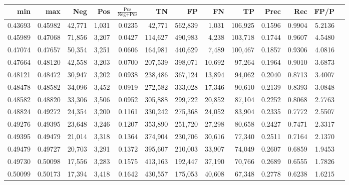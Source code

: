 \begin{tabular}{rrrrrrrrrrrrr}
\toprule
    min &     max &    Neg &   Pos & $\frac{\text{Pos}}{\text{Neg}+\text{Pos}}$ &      TN &      FP &      FN &      TP &   Prec &    Rec &   FP/P \\
\midrule
0.43693 & 0.45982 & 42,771 & 1,031 &                                     0.0235 &  42,771 & 562,839 &   1,031 & 106,925 & 0.1596 & 0.9904 & 5.2136 \\
0.45989 & 0.47068 & 71,856 & 3,207 &                                     0.0427 & 114,627 & 490,983 &   4,238 & 103,718 & 0.1744 & 0.9607 & 4.5480 \\
0.47074 & 0.47657 & 50,354 & 3,251 &                                     0.0606 & 164,981 & 440,629 &   7,489 & 100,467 & 0.1857 & 0.9306 & 4.0816 \\
0.47664 & 0.48120 & 42,558 & 3,203 &                                     0.0700 & 207,539 & 398,071 &  10,692 &  97,264 & 0.1964 & 0.9010 & 3.6873 \\
0.48121 & 0.48472 & 30,947 & 3,202 &                                     0.0938 & 238,486 & 367,124 &  13,894 &  94,062 & 0.2040 & 0.8713 & 3.4007 \\
0.48478 & 0.48582 & 34,096 & 3,452 &                                     0.0919 & 272,582 & 333,028 &  17,346 &  90,610 & 0.2139 & 0.8393 & 3.0848 \\
0.48582 & 0.48820 & 33,306 & 3,506 &                                     0.0952 & 305,888 & 299,722 &  20,852 &  87,104 & 0.2252 & 0.8068 & 2.7763 \\
0.48824 & 0.49272 & 24,354 & 3,200 &                                     0.1161 & 330,242 & 275,368 &  24,052 &  83,904 & 0.2335 & 0.7772 & 2.5507 \\
0.49276 & 0.49395 & 23,648 & 3,246 &                                     0.1207 & 353,890 & 251,720 &  27,298 &  80,658 & 0.2427 & 0.7471 & 2.3317 \\
0.49395 & 0.49479 & 21,014 & 3,318 &                                     0.1364 & 374,904 & 230,706 &  30,616 &  77,340 & 0.2511 & 0.7164 & 2.1370 \\
0.49479 & 0.49727 & 20,703 & 3,291 &                                     0.1372 & 395,607 & 210,003 &  33,907 &  74,049 & 0.2607 & 0.6859 & 1.9453 \\
0.49730 & 0.50098 & 17,556 & 3,283 &                                     0.1575 & 413,163 & 192,447 &  37,190 &  70,766 & 0.2689 & 0.6555 & 1.7826 \\
0.50099 & 0.50173 & 17,394 & 3,418 &                                     0.1642 & 430,557 & 175,053 &  40,608 &  67,348 & 0.2778 & 0.6238 & 1.6215 \\

\end{tabular}
